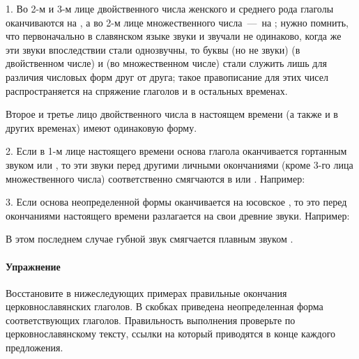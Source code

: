 \documentclass[11pt,a4paper,oneside]{memoir}
\begin{document}
    1. Во 2-м и 3-м лице двойственного числа женского и среднего рода глаголы оканчиваются на {}, а во 2-м лице множественного числа~---~на {}; нужно помнить, что первоначально в славянском языке звуки {} и {} звучали не одинаково, когда же эти звуки впоследствии стали однозвучны, то буквы (но не звуки) {} (в двойственном числе) и {} (во множественном числе) стали служить лишь для различия числовых форм друг от друга; такое правописание для этих чисел распространяется на спряжение глаголов и в остальных временах.
    
    Второе и третье лицо двойственного числа в настоящем времени (а также и в других временах) имеют одинаковую форму.
    
    2. Если в 1-м лице настоящего времени основа глагола оканчивается гортанным звуком {} или {}, то эти звуки перед другими личными окончаниями (кроме 3-го лица множественного числа) соответственно смягчаются в {} или {}. Например:
    
    
    3. Если основа неопределенной формы оканчивается на юсовское {}, то это {} перед окончаниями настоящего времени разлагается на свои древние звуки. Например:
    

    В этом последнем случае губной звук {} смягчается плавным звуком {}.

                    \paragraph{Упражнение}
    
    Восстановите в нижеследующих примерах правильные окончания церковнославянских глаголов. В скобках приведена неопределенная форма соответствующих глаголов. Правильность выполнения проверьте по церковнославянскому тексту, ссылки на который приводятся в конце каждого предложения.
    
\end{document}
